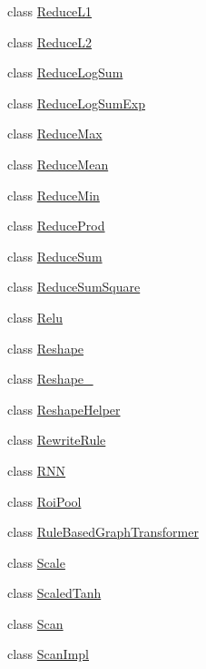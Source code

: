 \begin{DoxyCompactItemize}
\item 
class \mbox{\hyperlink{classonnxruntime_1_1ReduceL1}{Reduce\+L1}}
\item 
class \mbox{\hyperlink{classonnxruntime_1_1ReduceL2}{Reduce\+L2}}
\item 
class \mbox{\hyperlink{classonnxruntime_1_1ReduceLogSum}{Reduce\+Log\+Sum}}
\item 
class \mbox{\hyperlink{classonnxruntime_1_1ReduceLogSumExp}{Reduce\+Log\+Sum\+Exp}}
\item 
class \mbox{\hyperlink{classonnxruntime_1_1ReduceMax}{Reduce\+Max}}
\item 
class \mbox{\hyperlink{classonnxruntime_1_1ReduceMean}{Reduce\+Mean}}
\item 
class \mbox{\hyperlink{classonnxruntime_1_1ReduceMin}{Reduce\+Min}}
\item 
class \mbox{\hyperlink{classonnxruntime_1_1ReduceProd}{Reduce\+Prod}}
\item 
class \mbox{\hyperlink{classonnxruntime_1_1ReduceSum}{Reduce\+Sum}}
\item 
class \mbox{\hyperlink{classonnxruntime_1_1ReduceSumSquare}{Reduce\+Sum\+Square}}
\item 
class \mbox{\hyperlink{classonnxruntime_1_1Relu}{Relu}}
\item 
class \mbox{\hyperlink{classonnxruntime_1_1Reshape}{Reshape}}
\item 
class \mbox{\hyperlink{classonnxruntime_1_1Reshape__1}{Reshape\+\_}}
\item 
class \mbox{\hyperlink{classonnxruntime_1_1ReshapeHelper}{Reshape\+Helper}}
\item 
class \mbox{\hyperlink{classonnxruntime_1_1RewriteRule}{Rewrite\+Rule}}
\item 
class \mbox{\hyperlink{classonnxruntime_1_1RNN}{R\+NN}}
\item 
class \mbox{\hyperlink{classonnxruntime_1_1RoiPool}{Roi\+Pool}}
\item 
class \mbox{\hyperlink{classonnxruntime_1_1RuleBasedGraphTransformer}{Rule\+Based\+Graph\+Transformer}}
\item 
class \mbox{\hyperlink{classonnxruntime_1_1Scale}{Scale}}
\item 
class \mbox{\hyperlink{classonnxruntime_1_1ScaledTanh}{Scaled\+Tanh}}
\item 
class \mbox{\hyperlink{classonnxruntime_1_1Scan}{Scan}}
\item 
class \mbox{\hyperlink{classonnxruntime_1_1ScanImpl}{Scan\+Impl}}
\item 

\end{DoxyCompactItemize}
